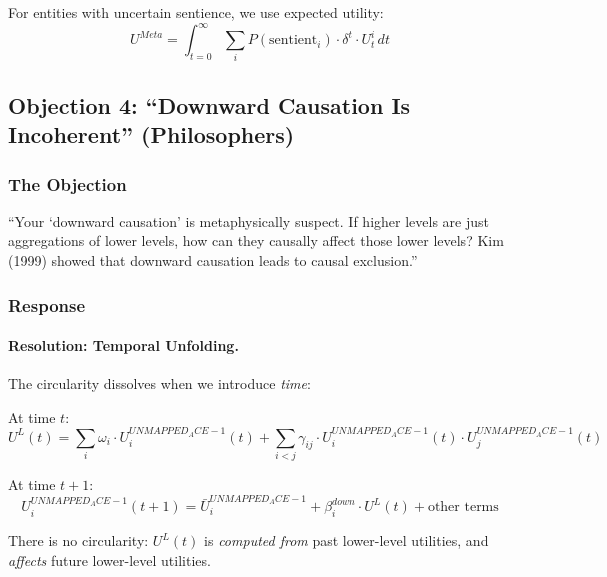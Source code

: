 For entities with uncertain sentience, we use expected utility:
\begin{equation}
U^{Meta} = \int_{t=0}^{\infty} \sum_{i} P(\text{sentient}_i) \cdot \delta^t \cdot U^i_t \, dt
\end{equation}

\subsection{Objection 4: ``Downward Causation Is Incoherent'' (Philosophers)}

\subsubsection{The Objection}

\begin{tcolorbox}[colback=red!5!white, colframe=red!75!black, title=Philosopher's Objection]
``Your `downward causation' is metaphysically suspect. If higher levels are 
just aggregations of lower levels, how can they causally affect those lower 
levels? Kim (1999) showed that downward causation leads to causal exclusion.''
\end{tcolorbox}

\subsubsection{Response}

\paragraph{Resolution: Temporal Unfolding.}

The circularity dissolves when we introduce \textit{time}:

At time $t$:
\begin{equation}
U^L(t) = \sum_i \omega_i \cdot U^{UNMAPPED_ACE-1}_i(t) + \sum_{i<j} \gamma_{ij} \cdot U^{UNMAPPED_ACE-1}_i(t) \cdot U^{UNMAPPED_ACE-1}_j(t)
\end{equation}

At time $t+1$:
\begin{equation}
U^{UNMAPPED_ACE-1}_i(t+1) = \bar{U}^{UNMAPPED_ACE-1}_i + \beta^{down}_i \cdot U^L(t) + \text{other terms}
\end{equation}

There is no circularity: $U^L(t)$ is \textit{computed from} past lower-level 
utilities, and \textit{affects} future lower-level utilities.

